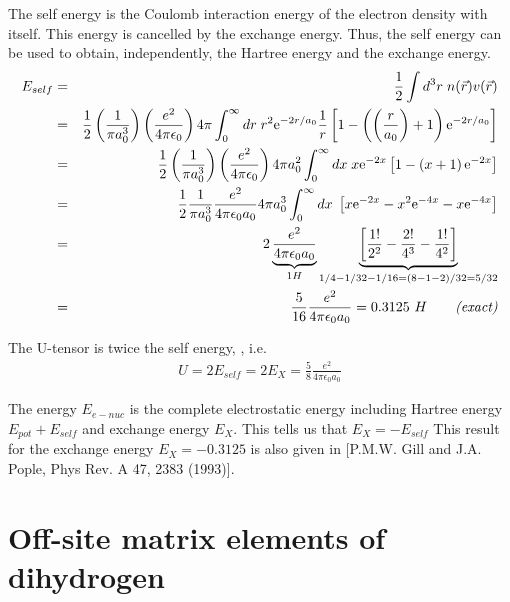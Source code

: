 \documentclass[11pt,a4paper]{report}
\begin{document}
The self energy is the Coulomb interaction energy of the electron
density with itself. This energy is cancelled by the exchange
energy. Thus, the self energy can be used to obtain, independently,
the Hartree energy and the exchange energy.
\begin{eqnarray}
E_{self}&=&\frac{1}{2}\int d^3r\;n(\vec{r})v(\vec{r})
\nonumber\\
&=&\frac{1}{2}\left(\frac{1}{\pi a_0^3}\right) \left(\frac{e^2}{4\pi\epsilon_0}\right)  4\pi 
\int_0^\infty dr\;r^2 \mathrm{e}^{-2r/a_0} \frac{1}{r}  \left[1-\left(\left(\frac{r}{a_0}\right)  +1\right)\mathrm{e}^{-2r/a_0}\right]
\nonumber\\
&=&\frac{1}{2}\left(\frac{1}{\pi a_0^3}\right)\left(\frac{e^2}{4\pi\epsilon_0}\right)  4\pi 
a_0^2\int_0^\infty dx\;x \mathrm{e}^{-2x} \left[1-\left(x+1\right)\mathrm{e}^{-2x}\right]
\nonumber\\
&=&\frac{1}{2}\frac{1}{\pi a_0^3} \frac{e^2}{4\pi\epsilon_0a_0}  4\pi 
a_0^3  \int_0^\infty dx\;  \left[x\mathrm{e}^{-2x}-x^2\mathrm{e}^{-4x}-x\mathrm{e}^{-4x}\right]
\nonumber\\
&=&2 \underbrace{\frac{e^2}{4\pi\epsilon_0a_0}}_{1H}  
 \underbrace{\left[\frac{1!}{2^2}-\frac{2!}{4^3}-\frac{1!}{4^2}\right]}_{1/4-1/32-1/16=(8-1-2)/32=5/32}
\nonumber\\
&=&\frac{5}{16} \frac{e^2}{4\pi\epsilon_0a_0}=0.3125~H\qquad \textit{(exact)}
\label{eq:hatomeself}
\end{eqnarray}

The U-tensor is twice the self energy, , i.e.
\begin{eqnarray}
U=2E_{self}=2 E_X=\frac{5}{8}\frac{e^2}{4\pi\epsilon_0 a_0}
\label{eq:hatomonsiteU}
\end{eqnarray}

The energy $E_{e-nuc}$ is the complete electrostatic energy including
Hartree energy $E_{pot}+E_{self}$ and exchange energy $E_X$. This
tells us that $E_X=-E_{self}$ This result for the exchange energy
$E_X=-0.3125$ is also given in [P.M.W. Gill and J.A. Pople, Phys Rev. A
  47, 2383 (1993)]\cite{gill93_pra47_2383}.

\section{Off-site matrix elements of dihydrogen}
\label{sec:hoffsitematrixelements}
\end{document}
